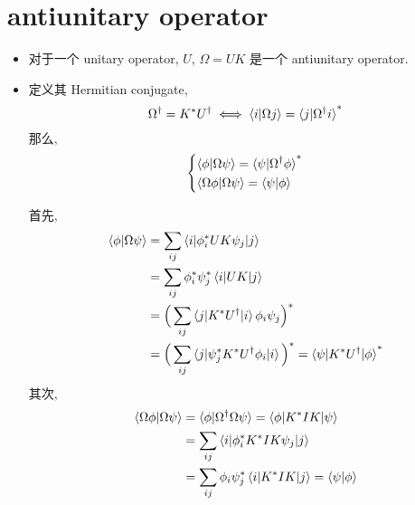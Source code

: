 \section{antiunitary operator}
\begin{itemize}
	\item 对于一个 unitary operator, $U$, $\Omega = U K$ 是一个 antiunitary operator.
	
	\item 定义其 Hermitian conjugate,
	\begin{equation}
		\Omega^\dag = K^* U^\dag \iff \braket{i | \Omega j} = \braket{j | \Omega^\dag i}^*
	\end{equation}
	那么,
	\begin{equation}
		\begin{dcases}
			\braket{\phi | \Omega \psi} = \braket{\psi | \Omega^\dag \phi}^* \\
			\braket{\Omega \phi | \Omega \psi} = \braket{\psi | \phi}
		\end{dcases}
	\end{equation}
	
	\begin{tcolorbox}[title=proof:]
		首先,
		\begin{align}
			\braket{\phi | \Omega \psi} &= \sum_{i j} \braket{i | \phi^*_i U K \psi_j | j} \notag \\
			&= \sum_{i j} \phi^*_i \psi^*_j \braket{i | U K | j} \notag \\
			&= \Big( \sum_{i j} \braket{j | K^* U^\dag | i} \phi_i \psi_j \Big)^* \notag \\
			&= \Big( \sum_{i j} \braket{j | \psi^*_j K^* U^\dag \phi_i | i} \Big)^* = \braket{\psi | K^* U^\dag | \phi}^*
		\end{align}
		其次,
		\begin{align}
			\braket{\Omega \phi | \Omega \psi} &= \braket{\phi | \Omega^\dag \Omega \psi} = \braket{\phi | K^* I K | \psi} \notag \\
			&= \sum_{i j} \braket{i | \phi^*_i K^* I K \psi_j | j} \notag \\
			&= \sum_{i j} \phi_i \psi^*_j \braket{i | K^* I K | j} = \braket{\psi | \phi}
		\end{align}
	\end{tcolorbox}
\end{itemize}

